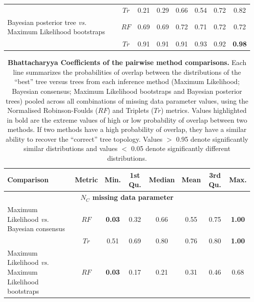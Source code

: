 \begin{landscape}
\begin{table}[!htb]
\begin{tabular}{lccccccc}
                                                                       & $Tr$ & 0.21 & 0.29 & 0.66 & 0.54 & 0.72 & 0.82 \\ 
    Bayesian posterior tree \textit{vs.} Maximum Likelihood bootstraps & $RF$ & 0.69 & 0.69 & 0.72 & 0.71 & 0.72 & 0.72 \\ 
                                                                       & $Tr$ & 0.91 & 0.91 & 0.91 & 0.93 & 0.92 & \textbf{0.98} \\ 
   \hline  
\end{tabular}
\end{table}
\end{landscape}

\begin{landscape}
\begin{table}[!htb]
\caption[Bhattacharyya Coefficients of the pairwise method comparisons ($N_{C}$ and all parameters combination)]{\footnotesize{\textbf{Bhattacharyya Coefficients of the pairwise method comparisons.}
Each line summarizes the probabilities of overlap between the distributions of the ``best'' tree versus trees from each inference method (Maximum Likelihood; Bayesian consensus; Maximum Likelihood bootstraps and Bayesian posterior trees) pooled across all combinations of missing data parameter values, using the Normalised Robinson-Foulds ($RF$) and Triplets ($Tr$) metrics. 
Values highlighted in bold are the extreme values of high or low probability of overlap between two methods. If two methods have a high probability of overlap, they have a similar ability to recover the ``correct'' tree topology.
Values $>$ 0.95 denote significantly similar distributions and values $<$ 0.05 denote significantly different distributions.}} %
\label{Tab_Supp_summary_BC_NC_Global}
\centering
\begin{tabular}{lccccccc}
  \hline
 Comparison &  Metric & Min. & 1st Qu. & Median & Mean & 3rd Qu. & Max. \\  
  \hline
  \multicolumn{8}{c}{\textbf{$N_{C}$ missing data parameter}}\\
  \hline
    Maximum Likelihood \textit{vs.} Bayesian consensus                 & $RF$ & \textbf{0.03} & 0.32 & 0.66 & 0.55 & 0.75 & \textbf{1.00} \\ 
                                                                       & $Tr$ & 0.51 & 0.69 & 0.80 & 0.76 & 0.80 & \textbf{1.00} \\ 
    Maximum Likelihood \textit{vs.} Maximum Likelihood bootstraps      & $RF$ & \textbf{0.03} & 0.17 & 0.21 & 0.31 & 0.46 & 0.68 \\ 

\end{tabular}
\end{table}
\end{landscape}

